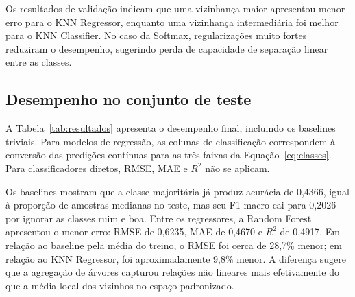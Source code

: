 \documentclass[12pt,a4paper]{article}
\begin{document}
Os resultados de valida\c{c}\~ao indicam que uma vizinhan\c{c}a maior apresentou menor erro para o KNN Regressor, enquanto uma vizinhan\c{c}a intermedi\'aria foi melhor para o KNN Classifier. No caso da Softmax, regulariza\c{c}\~oes muito fortes reduziram o desempenho, sugerindo perda de capacidade de separa\c{c}\~ao linear entre as classes.

\subsection{Desempenho no conjunto de teste}
\label{subsec:desempenho-teste}

A Tabela~\ref{tab:resultados} apresenta o desempenho final, incluindo os baselines triviais. Para modelos de regress\~ao, as colunas de classifica\c{c}\~ao correspondem \`a convers\~ao das predi\c{c}\~oes cont\'inuas para as tr\^es faixas da Equa\c{c}\~ao~\ref{eq:classes}. Para classificadores diretos, RMSE, MAE e $R^2$ n\~ao se aplicam.

\begin{table}[htbp]
\centering
\caption{Desempenho dos modelos e baselines no conjunto de teste.}
\label{tab:resultados}
\end{table}

Os baselines mostram que a classe majorit\'aria j\'a produz acur\'acia de 0,4366, igual \`a propor\c{c}\~ao de amostras medianas no teste, mas seu F1 macro cai para 0,2026 por ignorar as classes ruim e boa. Entre os regressores, a Random Forest apresentou o menor erro: RMSE de 0,6235, MAE de 0,4670 e $R^2$ de 0,4917. Em rela\c{c}\~ao ao baseline pela m\'edia do treino, o RMSE foi cerca de 28,7\% menor; em rela\c{c}\~ao ao KNN Regressor, foi aproximadamente 9,8\% menor. A diferen\c{c}a sugere que a agrega\c{c}\~ao de \'arvores capturou rela\c{c}\~oes n\~ao lineares mais efetivamente do que a m\'edia local dos vizinhos no espa\c{c}o padronizado.
\end{document}
